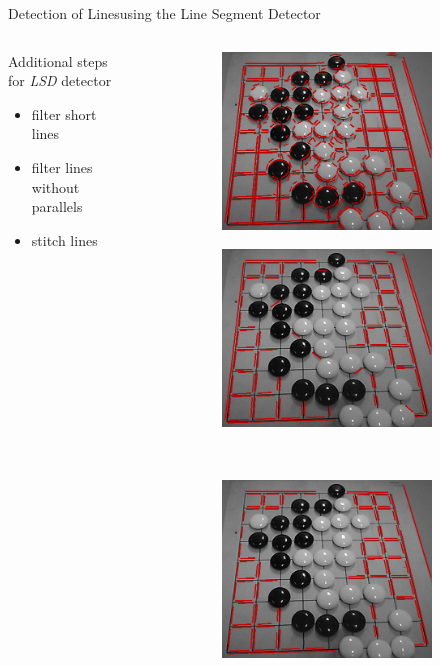 \documentclass[table]{beamer}
\begin{document}
\begin{frame}{Detection of Lines}{using the Line Segment Detector}
	\begin{columns}
		\begin{column}{0.45\textwidth}
			Additional steps for \emph{LSD} detector
			\begin{itemize}
				\item filter short lines
				\item filter lines without parallels
				\item stitch lines
			\end{itemize}
		\end{column}
		\begin{column}{0.5\textwidth}
			\begin{figure}
				\begin{center}
					\begin{subfigure}{}
						\includegraphics[width=0.45\columnwidth]{images/lsd_first.png}
					\end{subfigure}
					\begin{subfigure}{}
						\includegraphics[width=0.45\columnwidth]{images/lsd_length.png}
					\end{subfigure}
					\\
					\begin{subfigure}{}
						\includegraphics[width=0.45\columnwidth]{images/lsd_parallel.png}

\end{subfigure}
\end{center}
\end{figure}
\end{column}
\end{columns}
\end{frame}
\end{document}
